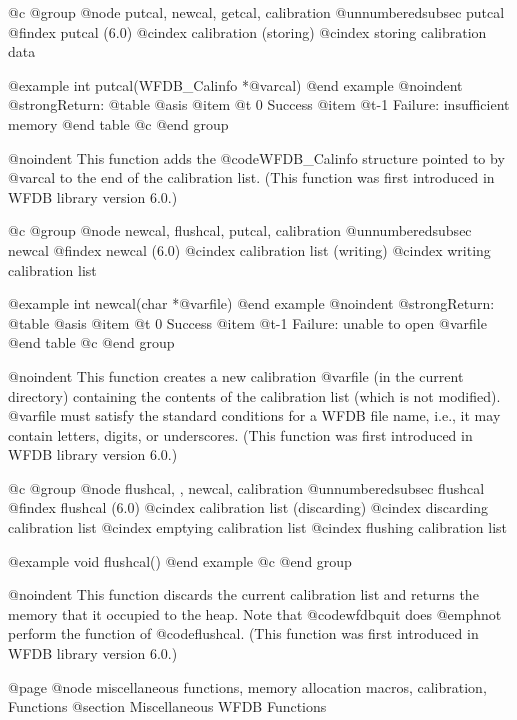 {{{{{{{{@c @group
@node    putcal, newcal, getcal, calibration
@unnumberedsubsec putcal
@findex putcal (6.0)
@cindex calibration (storing)
@cindex storing calibration data

@example
int putcal(WFDB_Calinfo *@var{cal})
@end example
@noindent
@strong{Return:}
@table @asis
@item @t{ 0}
Success
@item @t{-1}
Failure: insufficient memory
@end table
@c @end group

@noindent
This function adds the @code{WFDB_Calinfo} structure pointed to by @var{cal}
to the end of the calibration list.  (This function was first introduced
in WFDB library version 6.0.)

@c @group
@node    newcal, flushcal, putcal, calibration
@unnumberedsubsec newcal
@findex newcal (6.0)
@cindex calibration list (writing)
@cindex writing calibration list

@example
int newcal(char *@var{file})
@end example
@noindent
@strong{Return:}
@table @asis
@item @t{ 0}
Success
@item @t{-1}
Failure: unable to open @var{file}
@end table
@c @end group

@noindent
This function creates a new calibration @var{file} (in the current
directory) containing the contents of the calibration list (which is not
modified).  @var{file} must satisfy the standard conditions for a WFDB
file name, i.e., it may contain letters, digits, or underscores.  (This
function was first introduced in WFDB library version 6.0.)

@c @group
@node    flushcal, , newcal, calibration
@unnumberedsubsec flushcal
@findex flushcal (6.0)
@cindex calibration list (discarding)
@cindex discarding calibration list
@cindex emptying calibration list
@cindex flushing calibration list

@example
void flushcal()
@end example
@c @end group

@noindent
This function discards the current calibration list and returns the
memory that it occupied to the heap.  Note that @code{wfdbquit} does
@emph{not} perform the function of @code{flushcal}.  (This function was
first introduced in WFDB library version 6.0.)

@page
@node miscellaneous functions, memory allocation macros, calibration, Functions
@section Miscellaneous WFDB Functions

}}}}}}}}
